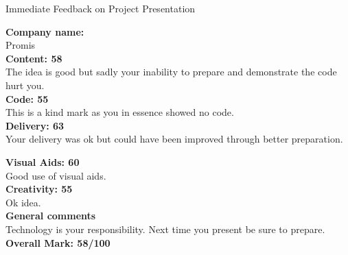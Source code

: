 \documentclass{article}
\begin{document}
\begin{center}
\Huge{Immediate Feedback on Project Presentation}\\
\end{center}


\normalsize
\textbf{Company name:}\\

Promis\\

\textbf{Content: 58}\\

The idea is good but sadly your inability to prepare and demonstrate the code hurt you.\\

\textbf{Code: 55}\\

This is a kind mark as you in essence showed no code.\\

\textbf{Delivery: 63}\\

Your delivery was ok but could have been improved through better preparation.

\textbf{Visual Aids: 60}\\

Good use of visual aids.\\

\textbf{Creativity: 55}\\

Ok idea.\\

\textbf{General comments}\\

Technology is your responsibility.
Next time you present be sure to prepare.\\

\textbf{Overall Mark: 58/100}
\end{document}
